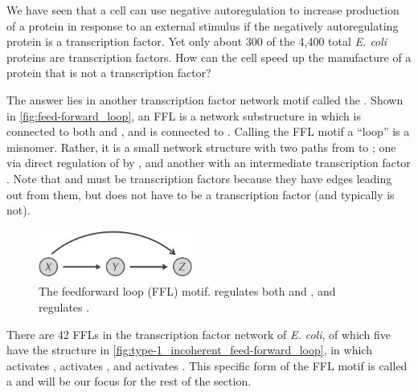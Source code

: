 We have seen that a cell can use negative autoregulation to increase production of a protein in response to an external stimulus if the negatively autoregulating protein is a transcription factor. Yet only about 300 of the 4,400 total \textit{E. coli} proteins are transcription factors. How can the cell speed up the manufacture of a protein that is not a transcription factor?

The answer lies in another transcription factor network motif called the . Shown in \autoref{fig:feed-forward_loop}, an FFL is a network substructure in which  is connected to both  and , and  is connected to . Calling the FFL motif a ``loop'' is a misnomer. Rather, it is a small network structure with two paths from  to ; one via direct regulation of  by , and another with an intermediate transcription factor . Note that  and  must be transcription factors because they have edges leading out from them, but  does not have to be a transcription factor (and typically is not).\\

\begin{figure}[h]
\centering
\mySfFamily
\includegraphics[width = 0.45\textwidth]{../images/feed-forward_loop.png}
\caption{The feedforward loop (FFL) motif.  regulates both  and , and  regulates .}
\label{fig:feed-forward_loop}
\end{figure}

 There are 42 FFLs in the transcription factor network of \textit{E. coli}, of which five have the structure in \autoref{fig:type-1_incoherent_feed-forward_loop}, in which  activates ,  activates , and  activates . This specific form of the FFL motif is  called a  and will be our focus for the rest of the section.\\
 
